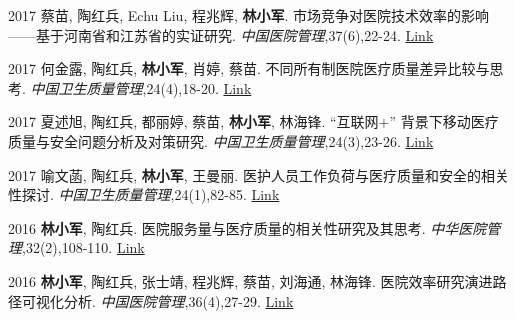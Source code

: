 \documentclass[12pt,letterpaper]{report}
\begin{document}
\begin{tablist}
		\item[2017]  \tab  蔡苗, 陶红兵, Echu Liu, 程兆辉, \textbf{林小军}. 市场竞争对医院技术效率的影响——基于河南省和江苏省的实证研究. \emph{中国医院管理},37(6),22-24. \href{http://kns.cnki.net/KCMS/detail/detail.aspx?dbcode=CJFQ&dbname=CJFDLAST2017&filename=YYGL201706012&v=MzEzMTREbFZMdkFQRFRNWXJHNEg5Yk1xWTlFWm9SOGVYMUx1eFlTN0RoMVQzcVRyV00xRnJDVVJMS2VadVp0Rmk=}{Link}\\[5pt]

		\item[2017]  \tab  何金露, 陶红兵, \textbf{林小军}, 肖婷, 蔡苗. 不同所有制医院医疗质量差异比较与思考. \emph{中国卫生质量管理},24(4),18-20. \href{http://kns.cnki.net/KCMS/detail/detail.aspx?dbcode=CJFQ&dbname=CJFDLAST2017&filename=WSJG201704010&v=MTU5NzM0OUVaSVI4ZVgxTHV4WVM3RGgxVDNxVHJXTTFGckNVUkxLZVp1WnRGaURtVTcvTU1qN0JhYkc0SDliTXE=}{Link}\\[5pt]

		\item[2017]  \tab 夏述旭, 陶红兵, 都丽婷, 蔡苗, \textbf{林小军}, 林海锋. “互联网+” 背景下移动医疗质量与安全问题分析及对策研究. \emph{中国卫生质量管理},24(3),23-26. \href{http://kns.cnki.net/KCMS/detail/detail.aspx?dbcode=CJFQ&dbname=CJFDLAST2017&filename=WSJG201703030&v=MjQwMTVHWklSOGVYMUx1eFlTN0RoMVQzcVRyV00xRnJDVVJMS2VadVp0RmlEbVViL01NajdCYWJHNEg5Yk1ySTk=}{Link}\\[5pt]

		\item[2017]  \tab  喻文菡, 陶红兵, \textbf{林小军}, 王曼丽. 医护人员工作负荷与医疗质量和安全的相关性探讨. \emph{中国卫生质量管理},24(1),82-85. \href{http://kns.cnki.net/KCMS/detail/detail.aspx?dbcode=CJFQ&dbname=CJFDLAST2017&filename=WSJG201701013&v=MDI5NThSOGVYMUx1eFlTN0RoMVQzcVRyV00xRnJDVVJMS2VadVp0RmlEbVY3M09NajdCYWJHNEg5Yk1ybzlFWjQ=}{Link}\\[5pt]

		
		\item[2016] \tab \textbf{林小军}, 陶红兵. 医院服务量与医疗质量的相关性研究及其思考. \emph{中华医院管理},32(2),108-110. \href{http://www.wanfangdata.com.cn/details/detail.do?_type=perio&id=zhyygl201602010}{Link}\\[5pt]

		\item[2016] \tab \textbf{林小军}, 陶红兵, 张士靖, 程兆辉, 蔡苗, 刘海通, 林海锋. 医院效率研究演进路径可视化分析. \emph{中国医院管理},36(4),27-29. \href{http://kns.cnki.net/KCMS/detail/detail.aspx?dbcode=CJFQ&dbname=CJFDLAST2016&filename=YYGL201604015&v=MjM5ODRSTEtlWnVadEZpRG5VNy9MUERUTVlyRzRIOWZNcTQ5RVlZUjhlWDFMdXhZUzdEaDFUM3FUcldNMUZyQ1U=}{Link}\\[5pt]


\end{tablist}
\end{document}
